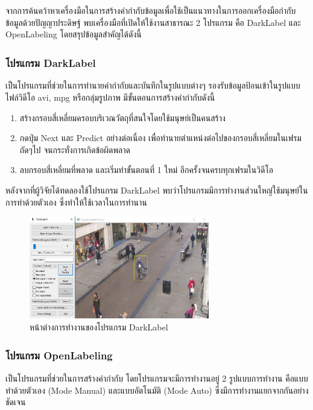 จากการค้นคว้าหาเครื่องมือในการสร้างคำกำกับข้อมูลเพื่อใช้เป็นแนวทางในการออกเครื่องมือกำกับข้อมูลด้วยปัญญาประดิษฐ์ พบเครื่องมือที่เปิดให้ใช้งานสาธารณะ 2 โปรแกรม 
คือ DarkLabel และ OpenLabeling โดยสรุปข้อมูลสำคัญได้ดังนี้ 
\subsubsection*{โปรแกรม DarkLabel\textsuperscript{\cite{dark}}}
เป็นโปรแกรมที่ช่วยในการทำนายคำกำกับและบันทึกในรูปแบบต่างๆ รองรับข้อมูลป้อนเข้าในรูปแบบไฟล์วิดีโอ avi, mpg หรือกลุ่มรูปภาพ มีขั้นตอนการสร้างคำกำกับดังนี้ 
\begin{enumerate}
	\setlength\itemsep{-0.25em}
	\item สร้างกรอบสี่เหลี่ยมครอบบริเวณวัตถุที่สนใจโดยใช้มนุษย์เป็นคนสร้าง
	\item กดปุ่ม Next และ Predict อย่างต่อเนื่อง เพื่อทำนายตำแหน่งต่อไปของกรอบสี่เหลี่ยมในเฟรมถัดๆไป จนกระทั่งการเกิดข้อผิดพลาด
	\item ลบกรอบสี่เหลี่ยมที่พลาด และเริ่มทำขั้นตอนที่ 1 ใหม่ อีกครั้งจนครบทุกเฟรมในวิดีโอ
\end{enumerate}

หลังจากที่ผู้วิจัยได้ทดลองใช้โปรแกรม DarkLabel พบว่าโปรแกรมมีการทำงานส่วนใหญ่ใช้มนุษย์ในการทำด้วยตัวเอง ซึ่งทำให้ใช้เวลาในการทำนาน

\begin{figure}[!ht]
	\centering
	\includegraphics[width=0.7\textwidth]{chapter2/images/darklabel.png}
		\caption{หน้าต่างการทำงานของโปรแกรม DarkLabel}
    	\label{fig:darklabel}
\end{figure}
\clearpage

\subsubsection*{โปรแกรม OpenLabeling\textsuperscript{\cite{open}}}
เป็นโปรแกรมที่ช่วยในการสร้างคำกำกับ โดยโปรแกรมจะมีการทำงานอยู่ 2 รูปแบบการทำงาน คือแบบทำด้วยตัวเอง (Mode Manual) และแบบอัตโนมัติ (Mode Auto) 
ซึ่งมีการทำงานแยกจากกันอย่างชัดเจน 

